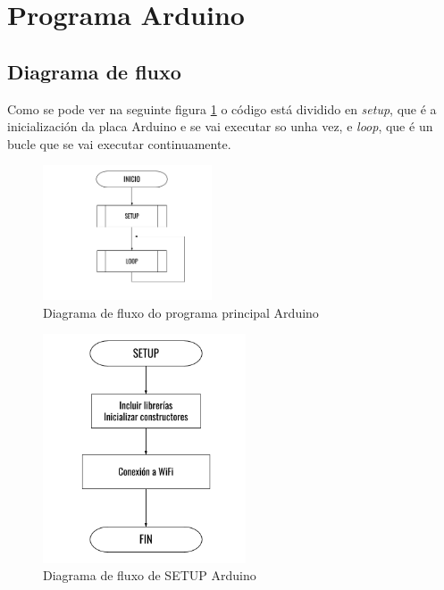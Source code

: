 \documentclass[11pt,twoside]{book}
\begin{document}
\section{Programa Arduino}

\subsection{Diagrama de fluxo}

Como se pode ver na seguinte figura \ref{fig:FluxoPrincipal} o código está dividido en \textit{setup}, que é a inicialización da placa Arduino e se vai executar so unha vez, e \textit{loop}, que é un bucle que se vai executar continuamente.

\begin{figure}[H]
	\begin{center}
		\includegraphics[width=5cm]{images/diagrama_flujo_inicio.png}
	\end{center}
	\caption{Diagrama de fluxo do programa principal Arduino}
	\label{fig:FluxoPrincipal}
\end{figure}

\begin{figure}[H]
	\begin{center}
		\includegraphics[width=6cm]{images/diagrama_flujo_setup.png}
	\end{center}
	\caption{Diagrama de fluxo de SETUP Arduino}
	\label{fig:FluxoSETUP}
\end{figure}
\end{document}
